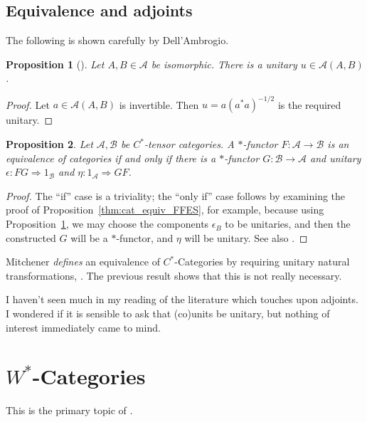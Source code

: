\documentclass[a4paper,11pt]{article}
\theoremstyle{plain}
\newtheorem{proposition}{Proposition}[section]
\theoremstyle{remark}
\newcommand{\mc}[1]{\mathcal{#1}}
\begin{document}
\subsection{Equivalence and adjoints}

The following is shown carefully by Dell'Ambrogio.

\begin{proposition}[{\cite[Proposition~2.6]{DellAmbrogio_unitary_monoidal}}]\label{prop:always_unitary_IM}
Let $A,B\in\mc A$ be isomorphic.  There is a unitary $u\in\mc A(A,B)$.
\end{proposition}
\begin{proof}
Let $a\in\mc A(A,B)$ is invertible.  Then $u = a (a^*a)^{-1/2}$ is the required unitary.
\end{proof}

\begin{proposition}\label{prop:equiv_star_cats}
Let $\mc A,\mc B$ be $C^*$-tensor categories.  A $*$-functor $F\colon \mc A\to\mc B$ is an equivalence of categories if and only if there is a $*$-functor $G \colon \mc B \to \mc A$ and unitary $\epsilon \colon FG \Rightarrow 1_{\mc B}$ and $\eta \colon 1_{\mc A} \Rightarrow GF$.
\end{proposition}
\begin{proof}
The ``if'' case is a triviality; the ``only if'' case follows by examining the proof of Proposition~\ref{thm:cat_equiv_FFES}, for example, because using Proposition~\ref{prop:always_unitary_IM}, we may choose the components $\epsilon_B$ to be unitaries, and then the constructed $G$ will be a $*$-functor, and $\eta$ will be unitary.  See also \cite[Lemma~4.6]{DellAmbrogio_unitary_monoidal}.
\end{proof}

Mitchener \emph{defines} an equivalence of $C^*$-Categories by requiring unitary natural transformations, \cite[Definition~2.13]{mitchener_cstar_cats}.  The previous result shows that this is not really necessary.

I haven't seen much in my reading of the literature which touches upon adjoints.  I wondered if it is sensible to ask that (co)units be unitary, but nothing of interest immediately came to mind.



\section{\texorpdfstring{$W^*$}{WStar}-Categories}

This is the primary topic of \cite{GLR_Wstar_categories}.
\end{document}
